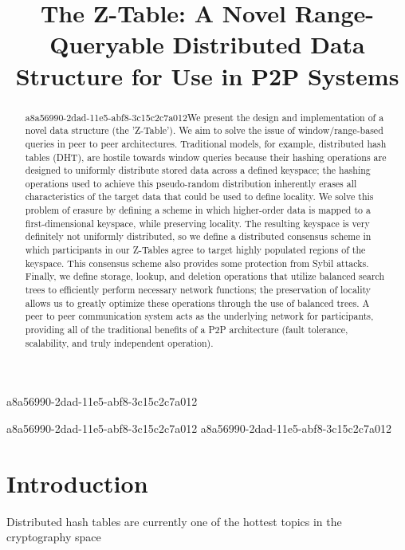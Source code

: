 \documentclass[12pt]{article}
\title{The Z-Table: A Novel Range-Queryable Distributed Data Structure for Use in P2P Systems}
\begin{document}
\maketitle
a8a56990-2dad-11e5-abf8-3c15c2c7a012
\begin{abstract}
a8a56990-2dad-11e5-abf8-3c15c2c7a012We present the design and implementation of a novel data structure (the 'Z-Table'). We aim to solve the issue of window/range-based queries in peer to peer architectures. Traditional models, for example,  distributed hash tables (DHT), are hostile towards window queries because their hashing operations are designed to uniformly distribute stored data across a defined keyspace; the hashing operations used to achieve this pseudo-random distribution inherently erases all characteristics of the target data that could be used to define locality. We solve this problem of erasure by defining a scheme in which higher-order data is mapped to a first-dimensional keyspace, while preserving locality. The resulting keyspace is very definitely not uniformly distributed, so we define a distributed consensus scheme in which participants in our Z-Tables agree to target highly populated regions of the keyspace. This consensus scheme also provides some protection from Sybil attacks. Finally, we define storage, lookup, and deletion operations that utilize balanced search trees to efficiently perform necessary network functions; the preservation of locality allows us to greatly optimize these operations through the use of balanced trees. A peer to peer communication system acts as the underlying network for participants, providing all of the traditional benefits of a P2P architecture (fault tolerance, scalability, and truly independent operation).
\end{abstract}

a8a56990-2dad-11e5-abf8-3c15c2c7a012
a8a56990-2dad-11e5-abf8-3c15c2c7a012\newpage
\section{Introduction}
Distributed hash tables are currently one of the hottest topics in the cryptography space~\cite{Stoica:2001dj,Rowstron:2001ea,Ratnasamy:2001wn}

\printbibliography
\end{document}
